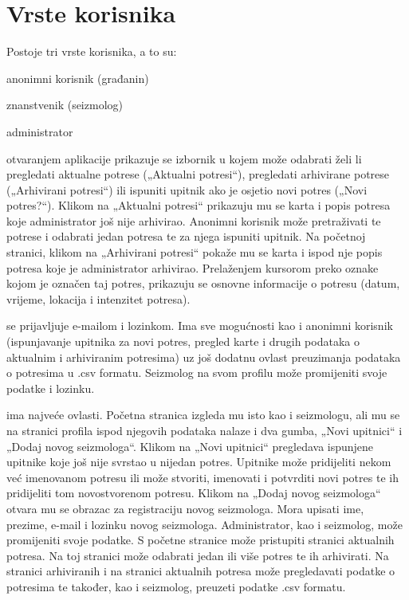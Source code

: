 \section{Vrste korisnika}
Postoje tri vrste korisnika, a to su:
\begin{packed_item}
	\item anonimni korisnik (građanin)
	\item znanstvenik (seizmolog)
	\item administrator
\end{packed_item}

 otvaranjem aplikacije prikazuje se izbornik u kojem može odabrati želi li pregledati aktualne potrese („Aktualni potresi“), pregledati arhivirane potrese („Arhivirani potresi“) ili ispuniti upitnik ako je osjetio novi potres („Novi potres?“). Klikom na „Aktualni potresi“ prikazuju mu se karta i popis potresa koje administrator još nije arhivirao. Anonimni korisnik može pretraživati te potrese i odabrati jedan potresa te za njega ispuniti upitnik. Na početnoj stranici, klikom na „Arhivirani potresi“ pokaže mu se karta i ispod nje popis potresa koje je administrator arhivirao. Prelaženjem kursorom preko oznake kojom je označen taj potres, prikazuju se osnovne informacije o potresu (datum, vrijeme, lokacija i intenzitet potresa).

 se prijavljuje e-mailom i lozinkom. Ima sve mogućnosti kao i anonimni korisnik (ispunjavanje upitnika za novi potres, pregled karte i drugih podataka o aktualnim i arhiviranim potresima) uz još dodatnu ovlast preuzimanja podataka o potresima u .csv formatu. Seizmolog na svom profilu može promijeniti svoje podatke i lozinku.

 ima najveće ovlasti. Početna stranica izgleda mu isto kao i seizmologu, ali mu se na stranici profila ispod njegovih podataka nalaze i dva gumba, „Novi upitnici“ i „Dodaj novog seizmologa“. Klikom na „Novi upitnici“ pregledava ispunjene upitnike koje još nije svrstao u nijedan potres. Upitnike može pridijeliti nekom već imenovanom potresu ili može stvoriti, imenovati i potvrditi novi potres te ih pridijeliti tom novostvorenom potresu. Klikom na „Dodaj novog seizmologa“ otvara mu se obrazac za registraciju novog seizmologa. Mora upisati ime, prezime, e-mail i lozinku novog seizmologa. Administrator, kao i seizmolog, može promijeniti svoje podatke. S početne stranice može pristupiti stranici aktualnih potresa. Na toj stranici može odabrati jedan ili više potres te ih arhivirati. Na stranici arhiviranih i na stranici aktualnih potresa može pregledavati podatke o potresima te također, kao i seizmolog, preuzeti podatke .csv formatu.

